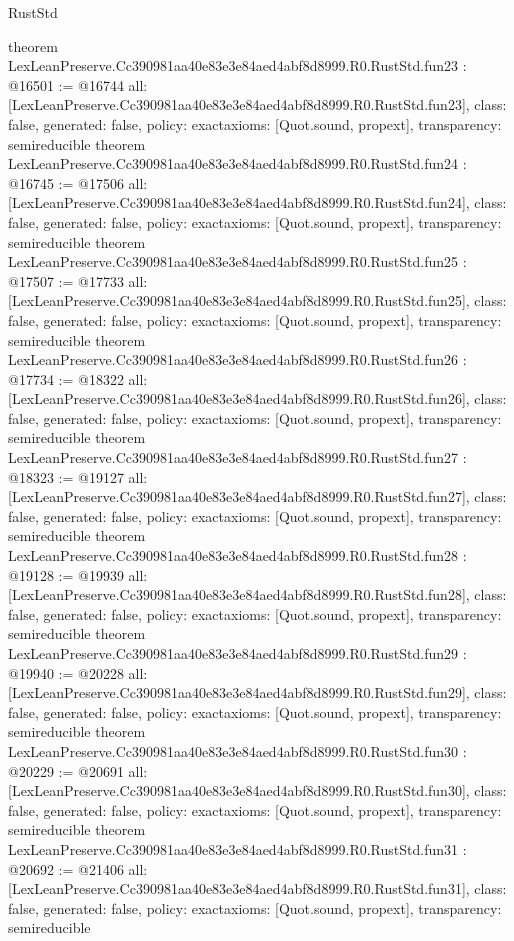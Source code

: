 \begin{lexlean}{RustStd}
\begin{coremodule}
{}
theorem LexLeanPreserve.Cc390981aa40e83e3e84aed4abf8d8999.R0.RustStd.fun23 : @16501 := @16744 {
  all: [LexLeanPreserve.Cc390981aa40e83e3e84aed4abf8d8999.R0.RustStd.fun23],
  class: false,
  generated: false,
  policy: exact{axioms: [Quot.sound, propext]},
  transparency: semireducible
}
theorem LexLeanPreserve.Cc390981aa40e83e3e84aed4abf8d8999.R0.RustStd.fun24 : @16745 := @17506 {
  all: [LexLeanPreserve.Cc390981aa40e83e3e84aed4abf8d8999.R0.RustStd.fun24],
  class: false,
  generated: false,
  policy: exact{axioms: [Quot.sound, propext]},
  transparency: semireducible
}
theorem LexLeanPreserve.Cc390981aa40e83e3e84aed4abf8d8999.R0.RustStd.fun25 : @17507 := @17733 {
  all: [LexLeanPreserve.Cc390981aa40e83e3e84aed4abf8d8999.R0.RustStd.fun25],
  class: false,
  generated: false,
  policy: exact{axioms: [Quot.sound, propext]},
  transparency: semireducible
}
theorem LexLeanPreserve.Cc390981aa40e83e3e84aed4abf8d8999.R0.RustStd.fun26 : @17734 := @18322 {
  all: [LexLeanPreserve.Cc390981aa40e83e3e84aed4abf8d8999.R0.RustStd.fun26],
  class: false,
  generated: false,
  policy: exact{axioms: [Quot.sound, propext]},
  transparency: semireducible
}
theorem LexLeanPreserve.Cc390981aa40e83e3e84aed4abf8d8999.R0.RustStd.fun27 : @18323 := @19127 {
  all: [LexLeanPreserve.Cc390981aa40e83e3e84aed4abf8d8999.R0.RustStd.fun27],
  class: false,
  generated: false,
  policy: exact{axioms: [Quot.sound, propext]},
  transparency: semireducible
}
theorem LexLeanPreserve.Cc390981aa40e83e3e84aed4abf8d8999.R0.RustStd.fun28 : @19128 := @19939 {
  all: [LexLeanPreserve.Cc390981aa40e83e3e84aed4abf8d8999.R0.RustStd.fun28],
  class: false,
  generated: false,
  policy: exact{axioms: [Quot.sound, propext]},
  transparency: semireducible
}
theorem LexLeanPreserve.Cc390981aa40e83e3e84aed4abf8d8999.R0.RustStd.fun29 : @19940 := @20228 {
  all: [LexLeanPreserve.Cc390981aa40e83e3e84aed4abf8d8999.R0.RustStd.fun29],
  class: false,
  generated: false,
  policy: exact{axioms: [Quot.sound, propext]},
  transparency: semireducible
}
theorem LexLeanPreserve.Cc390981aa40e83e3e84aed4abf8d8999.R0.RustStd.fun30 : @20229 := @20691 {
  all: [LexLeanPreserve.Cc390981aa40e83e3e84aed4abf8d8999.R0.RustStd.fun30],
  class: false,
  generated: false,
  policy: exact{axioms: [Quot.sound, propext]},
  transparency: semireducible
}
theorem LexLeanPreserve.Cc390981aa40e83e3e84aed4abf8d8999.R0.RustStd.fun31 : @20692 := @21406 {
  all: [LexLeanPreserve.Cc390981aa40e83e3e84aed4abf8d8999.R0.RustStd.fun31],
  class: false,
  generated: false,
  policy: exact{axioms: [Quot.sound, propext]},
  transparency: semireducible
}
\end{coremodule}
\end{lexlean}
